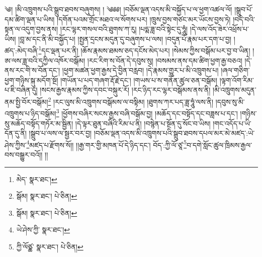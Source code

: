 \setcounter{footnote}{0} 
༄། །མི་འཁྲུགས་པའི་སྒྲུབ་ཐབས་བཞུགས། ། ༄༅༅། །བཅོམ་ལྡན་འདས་མི་བསྐྱོད་པ་ལ་ཕྱག་འཚལ་ལོ། །སྒྲུབ་པོ་དམ་ཚིག་ལྡན་པ་ཡིས། །དགོན་པའམ་གྲོང་མཐའ་ལ་སོགས་པར། །ཁྲུས་བྱས་གཙང་མར་ཡོངས་བྱས་ཏེ། །བདེ་བའི་སྟན་ལ་འདུག་བྱས་ནས། །རང་ལྷར་གསལ་བའི་ཐུགས་ཀ་རུ། །པདྨ་ཟླ་བའི་སྟེང་དུ་ཧཱུཾ། །དེ་ལས་འོད་ཟེར་འཕྲོས་པ་ཡིས། །བླ་མ་དང་ནི་མི་བསྐྱོད་པ། །སྤྱན་དྲངས་མདུན་དུ་བཞུགས་པ་ལས། །བདུན་པོ་རྣམ་པར་དག་པ་བྱ། །ཚད་:མེད་བཞི་\footnote{མེད་  སྣར་ཐང་། }དང་ལྡན་པར་ནི། །ཆོས་རྣམས་ཐམས་ཅད་དངོས་མེད་པར། །སེམས་ཀྱིས་བསྒོམ་པར་བྱ་བ་ཡིན། །ཨ་ལས་ཟླ་བའི་དཀྱིལ་འཁོར་བསྒོམ། །རང་རིག་ས་བོན་དེ་དབུས་སུ། །བསམས་ནས་དམ་ཚིག་ཕྱག་རྒྱ་བཅའ། །དེ་ནས་རང་གི་ས་བོན་དང་། །ཕྱག་མཚན་ཕྱག་རྒྱས་དེ་བྱིན་བརླབ། །དེ་རྣམས་གྱུར་པ་མི་འཁྲུགས་པ། །ཞལ་གཅིག་ཕྱག་གཉིས་སྐུ་མདོག་སྔོ། །གཡོན་པ་པད་གཞག་རྡོ་རྗེ་དང་། །གཡས་པ་ས་གནོན་ཚུལ་ཅན་བསྒོམ། །ལྟག་འོག་རིམ་པ་ཇི་བཞིན་དུ། །སངས་རྒྱས་རྣམས་ཀྱིས་དབང་བསྐུར་རོ། །རང་ཉིད་རང་ལྷར་བསྒོམས་ནས་ནི། །མི་འཁྲུགས་མདུན་ནམ་སྤྱི་བོར་བསྒོམ།\footnote{སྒོམ།  སྣར་ཐང་།  པེ་ཅིན། } །རང་ལུས་མི་འཁྲུགས་བསྒོམས་ལ་བསྟིམ། །ཐུགས་ཀར་པད་ཟླ་ཧཱུཾ་ལས་ནི། །དབུས་སུ་མི་འཁྲུགས་པ་ཉིད་བསྒོམ།\footnote{སྒོམ།  སྣར་ཐང་།  པེ་ཅིན། } །ཕྱོགས་བཞིར་སངས་རྒྱས་བཞི་བསྒོམ་བྱ། །མཆོད་དང་བསྟོད་དང་བཟླས་པ་དང་། །གཉིས་སུ་མཆོད་བསྟོད་གཏོར་མ་སྦྱིན། །དེ་ལྟར་ཐུན་བཞིའི་རིམ་པ་ནི། །བསྙེན་པ་སྔོན་དུ་སོང་བ་ཡིས། །གང་འདོད་པ་ཡི་དོན་དུ་ནི། །སྒྲུབ་པ་ལས་ལ་སྦྱར་བར་བྱ། །བཅོམ་ལྡན་འདས་མི་འཁྲུགས་པའི་སྒྲུབ་ཐབས་དཔལ་མར་མེ་མཛད་:ཡེ་ཤེས་ཀྱིས་\footnote{ཡེ་ཤེས་ཀྱི་  སྣར་ཐང་། }མཛད་པ་རྫོགས་སོ།། །།རྒྱ་གར་གྱི་མཁན་པོ་དེ་ཉིད་དང་། བོད་:ཀྱི་ལོ་ཙཱ་\footnote{ཀྱི་ལོཙྪ་  སྣར་ཐང་།  པེ་ཅིན། }བ་དགེ་སློང་ཚུལ་ཁྲིམས་རྒྱལ་བས་བསྒྱུར་བའོ།། །།